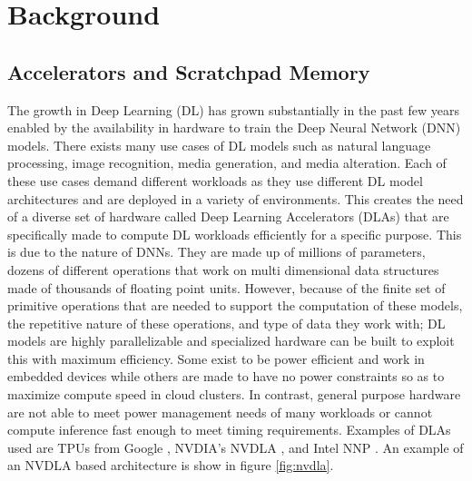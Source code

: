 
\chapter{Background} %

\label{Chapter1} %


\section{Accelerators and Scratchpad Memory}
The growth in Deep Learning (DL) has grown substantially in the past few years
enabled by the availability in hardware to train the Deep Neural Network (DNN)
models. There exists many use cases of DL models such as natural language
processing, image recognition, media generation, and media alteration. Each of
these use cases demand different workloads as they use different DL model
architectures and are deployed in a variety of environments. This creates the
need of a diverse set of hardware called Deep Learning Accelerators (DLAs) that
are specifically made to compute DL workloads efficiently for a specific
purpose. This is due to the nature of DNNs. They are made up of millions of
parameters, dozens of different operations that work on multi dimensional data
structures made of thousands of floating point units. However, because of the
finite set of primitive operations that are needed to support the computation
of these models, the repetitive nature of these operations, and type of data
they work with; DL models are highly parallelizable and specialized hardware
can be built to exploit this with maximum efficiency. Some exist to be power
efficient and work in embedded devices while others are made to have no power
constraints so as to maximize compute speed in cloud clusters. In contrast, general
purpose hardware are not able to meet power management needs of many workloads
or cannot compute inference fast enough to meet timing requirements. Examples
of DLAs used are TPUs from Google \cite{tensorflow}, NVDIA's NVDLA \cite{nvdla}, and Intel NNP \cite{nnp}.
An example of an NVDLA based architecture is show in figure \ref{fig:nvdla}.


